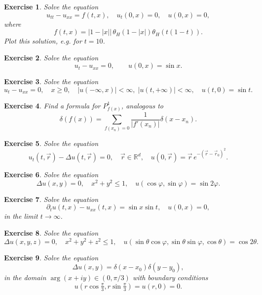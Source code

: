 \documentclass[11pt,a4paper]{article}
\newtheorem*{exercise}{Exercise}
\begin{document}
\begin{exercise}
	Solve the equation
	\[
	u_{tt} - u_{xx} = f(t, x), \quad u_t(0, x) = 0, \quad u(0, x) = 0,
	\]
	where
	\[
	f(t, x) = |1 - |x|| \, \theta_H(1 - |x|)\theta_H(t(1 - t)).
	\]
	Plot this solution, e.g. for $t = 10$.
\end{exercise}



\begin{exercise}
	Solve the equation
	\[
	u_t - u_{xx} = 0, \qquad u(0, x) = \sin x.
	\]
\end{exercise}

\begin{exercise}
	Solve the equation
	\[
	u_t - u_{xx} = 0, \quad x \ge 0, \quad |u(-\infty, x)| < \infty, \; |u(t, +\infty)| < \infty, \quad u(t, 0) = \sin t.
	\]
\end{exercise}


\begin{exercise}
	Find a formula for $P^1_{f(x)}$, analogous to
	\[
	\delta(f(x)) = \sum_{f(x_n) = 0} \frac{1}{|f'(x_n)|}\delta(x - x_n).
	\]
\end{exercise}

\begin{exercise}
	Solve the equation
	\[
	u_t(t, \vec{r}) - \Delta u(t, \vec{r}) = 0, \quad \vec{r} \in \mathbb{R}^d, \quad u(0, \vec{r}) = \vec{r}\, e^{-(\vec{r} - \vec{r}_0)^2}.
	\]
\end{exercise}

\begin{exercise}
	Solve the equation
	\[
	\Delta u(x, y) = 0, \quad x^2 + y^2 \le 1, \quad u(\cos \varphi, \sin \varphi) = \sin 2\varphi.
	\]
\end{exercise}

\begin{exercise}
	Solve the equation
	\[
	\partial_t u(t, x) - u_{xx}(t, x) = \sin x \sin t, \quad u(0, x) = 0,
	\]
	in the limit $t \to \infty$.
\end{exercise}

\begin{exercise}
	Solve the equation
	\[
	\Delta u(x, y, z) = 0, \quad x^2 + y^2 + z^2 \le 1, \quad u(\sin\theta\cos\varphi, \sin\theta\sin\varphi, \cos\theta) = \cos 2\theta.
	\]
\end{exercise}

\begin{exercise}
	Solve the equation
	\[
	\Delta u(x, y) = \delta(x - x_0)\delta(y - y_0),
	\]
	in the domain $\arg(x + iy) \in (0, \pi/3)$ with boundary conditions
	\[
	u(r\cos \tfrac{\pi}{3}, r\sin \tfrac{\pi}{3}) = u(r, 0) = 0.
	\]
\end{exercise}
\end{document}
